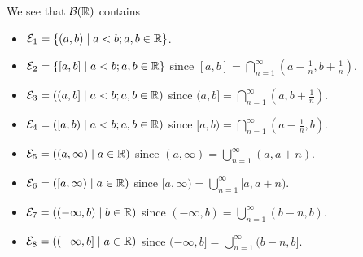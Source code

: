 \begin{eg}
	We see that \(\mathcal{B} (\mathbb{\MakeUppercase{R}} )\) contains
	\begin{itemize}
		\item \(\mathcal{E}_1 = \left\{(a, b) \mid a < b; a, b\in \mathbb{\MakeUppercase{R}} \right\}\).
		\item \(\mathcal{E}_2 = \left\{[a, b] \mid a < b; a, b\in \mathbb{\MakeUppercase{R}} \right\}\) since \([a, b] = \bigcap\limits_{n=1}^{\infty} (a - \frac{1}{n}, b + \frac{1}{n})\).
		\item \(\mathcal{E}_3 = \left((a, b]  \mid a < b; a, b\in \mathbb{\MakeUppercase{R}} \right)\) since \((a, b] = \bigcap\limits_{n=1}^{\infty} (a, b + \frac{1}{n})\).
		\item \(\mathcal{E}_4 = \left([a, b)  \mid a < b; a, b\in \mathbb{\MakeUppercase{R}} \right)\) since \([a, b) = \bigcap\limits_{n=1}^{\infty} (a - \frac{1}{n}, b)\).
		\item \(\mathcal{E}_5 = \left((a, \infty)  \mid a\in \mathbb{\MakeUppercase{R}} \right)\) since \((a, \infty) = \bigcup\limits_{n=1}^{\infty} (a , a + n)\).
		\item \(\mathcal{E}_6 = \left([a, \infty)  \mid a\in \mathbb{\MakeUppercase{R}} \right)\) since \([a, \infty) = \bigcup\limits_{n=1}^{\infty} [a , a + n)\).
		\item \(\mathcal{E}_7 = \left((-\infty, b) \mid b\in \mathbb{\MakeUppercase{R}} \right)\) since \((-\infty, b) = \bigcup\limits_{n=1}^{\infty} (b - n, b)\).
		\item \(\mathcal{E}_8 = \left((-\infty, b] \mid a\in \mathbb{\MakeUppercase{R}} \right)\) since \((-\infty, b] = \bigcup\limits_{n=1}^{\infty} (b - n, b]\).
	\end{itemize}
\end{eg}

